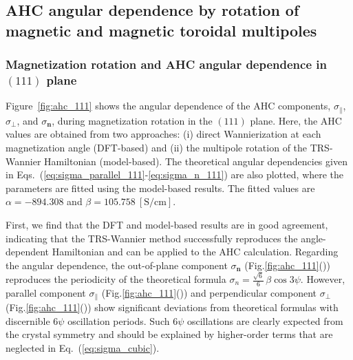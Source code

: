 \documentclass[preprint,12pt]{elsarticle}
\begin{document}
\subsection{AHC angular dependence by rotation of magnetic
and magnetic toroidal multipoles}

\subsubsection{Magnetization rotation and AHC angular dependence in
$(111)$ plane}
Figure~\ref{fig:ahc_111} shows the angular dependence of the AHC
components, $\sigma_\parallel$, $\sigma_\perp$, and $\sigma_{\bm n}$,
during magnetization rotation in the $(111)$ plane. Here, the AHC
values are obtained from two approaches: (i) direct Wannierization at
each magnetization angle (DFT-based) and (ii) the multipole rotation
of the TRS-Wannier Hamiltonian (model-based). The theoretical angular
dependencies given in
Eqs.~(\ref{eq:sigma_parallel_111}-\ref{eq:sigma_n_111}) are also plotted,
where the parameters are fitted using the model-based results.
The fitted values are
$\alpha=-894.308$ and $\beta=105.758 ~[\mathrm{S/cm}]$.

First, we find that the DFT and model-based results are in good
agreement, indicating that the TRS-Wannier method successfully
reproduces the angle-dependent Hamiltonian and can be applied to the
AHC calculation.
Regarding the angular dependence, the out-of-plane component $\sigma_{\bm n}$
(Fig.\ref{fig:ahc_111}()) reproduces the
periodicity of the
theoretical formula $\sigma_n = \frac{\sqrt{6}}{6}\,\beta \cos 3\psi$.
However, parallel component $\sigma_\parallel$
(Fig.\ref{fig:ahc_111}()) and perpendicular
component $\sigma_\perp$
(Fig.\ref{fig:ahc_111}()) show significant
deviations from theoretical formulas with discernible 6$\psi$
oscillation periods.
Such $6\psi$ oscillations are clearly expected from the crystal
symmetry and should be explained by higher-order terms that are
neglected in Eq.~(\ref{eq:sigma_cubic}).
\end{document}
